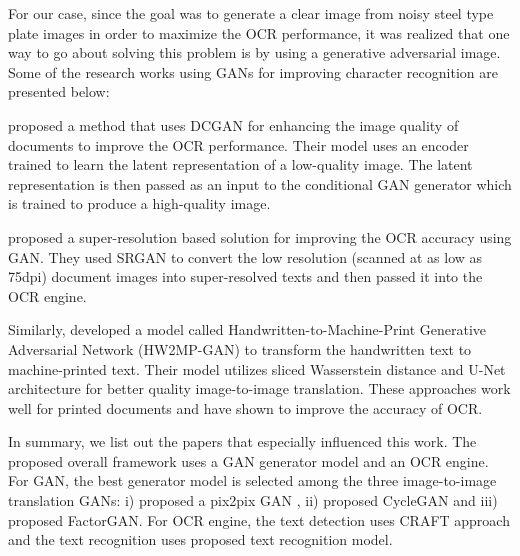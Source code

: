 	For our case, since the goal was to generate a clear image from noisy steel type plate images in order to maximize the OCR performance, it was realized that one way to go about solving this problem is by using a generative adversarial image. 
Some of the research works using GANs for improving character recognition are presented below:
\newline

	\cite{hosangadi2019ocr} proposed a method that uses DCGAN for enhancing the image quality of documents to improve the OCR performance. Their model uses an encoder trained to learn the latent representation of a low-quality image. The latent representation is then passed as an input to the conditional GAN generator which is trained to produce a high-quality image.
\newline
	
	 \cite{lat2018enhancing} proposed a super-resolution based solution for improving the OCR accuracy using GAN. They used SRGAN to convert the low resolution (scanned at as low as 75dpi) document images into super-resolved texts and then passed it into the OCR engine. 
\newline
	 
	 Similarly, \cite{karimi2020illegible} developed a model called Handwritten-to-Machine-Print Generative Adversarial Network (HW2MP-GAN) to transform the handwritten text to machine-printed text. Their model utilizes sliced Wasserstein distance and U-Net architecture for better quality image-to-image translation. These approaches work well for printed documents and have shown to improve the accuracy of OCR.
\newline

	In summary, we list out the papers that especially influenced this work. The proposed overall framework uses a GAN generator model and an OCR engine. For GAN, the best generator model is selected among the three image-to-image translation GANs: i) \cite{isola2017image} proposed a pix2pix GAN , ii) \cite{CycleGAN2017} proposed CycleGAN  and iii) \cite{stoller2019training} proposed FactorGAN. For OCR engine, the text detection uses CRAFT approach \citep{baek2019character} and the text recognition uses \cite{baek2019wrong} proposed text recognition model.